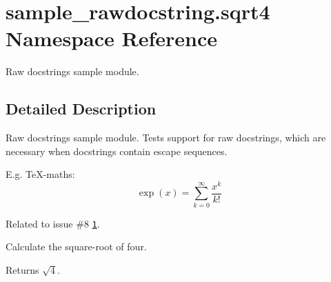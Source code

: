 \hypertarget{namespacesample__rawdocstring_1_1sqrt4}{\section{sample\-\_\-rawdocstring.\-sqrt4 Namespace Reference}
\label{namespacesample__rawdocstring_1_1sqrt4}
}


Raw docstrings sample module.  




\subsection{Detailed Description}
Raw docstrings sample module. Tests support for raw docstrings, which are necessary when docstrings contain escape sequences.

E.\-g. Te\-X-\/maths\-: \[ \exp(x) = \sum_{k=0}^{\infty} \frac{x^k}{k!} \]

Related to issue \#8 \href{https://github.com/Feneric/doxypypy/issues/8}{\tt 1}.

Calculate the square-\/root of four.

\begin{DoxyReturn}{Returns}
$ \sqrt{4} $. 
\end{DoxyReturn}
